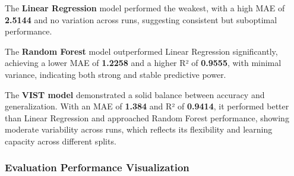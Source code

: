 \documentclass[11pt]{article}
\begin{document}
The \textbf{Linear Regression} model performed the weakest, with a high
MAE of \textbf{2.5144} and no variation across runs, suggesting
consistent but suboptimal performance.

The \textbf{Random Forest} model outperformed Linear Regression
significantly, achieving a lower MAE of \textbf{1.2258} and a higher R²
of \textbf{0.9555}, with minimal variance, indicating both strong and
stable predictive power.

The \textbf{VIST model} demonstrated a solid balance between accuracy
and generalization. With an MAE of \textbf{1.384} and R² of
\textbf{0.9414}, it performed better than Linear Regression and
approached Random Forest performance, showing moderate variability
across runs, which reflects its flexibility and learning capacity across
different splits.

    \subsubsection{Evaluation Performance
Visualization}\label{evaluation-performance-visualization}
\end{document}
